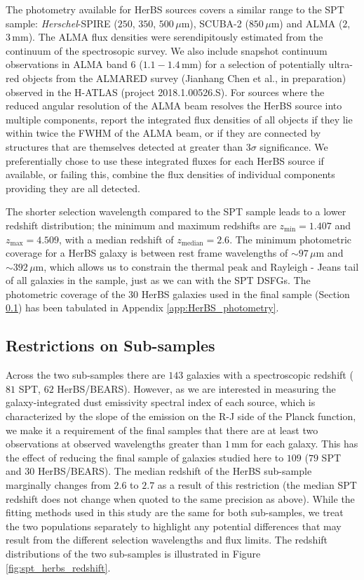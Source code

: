 The photometry available for HerBS sources covers a similar range to the SPT sample: \textit{Herschel}-SPIRE ($250$, $350$, $500\,\mu$m), SCUBA-2 ($850\,\mu$m) and ALMA ($2$, $3\,$mm). The ALMA flux densities were serendipitously estimated from the continuum of the spectrosopic survey. We also include snapshot continuum observations in ALMA band 6 ($1.1 - 1.4\,$mm) for a selection of potentially ultra-red objects from the ALMARED survey (Jianhang Chen et al., in preparation) observed in the H-ATLAS (project 2018.1.00526.S). For sources where the reduced angular resolution of the ALMA beam resolves the HerBS source into multiple components, \citealt{Bendo_2023} report the integrated flux densities of all objects if they lie within twice the FWHM of the ALMA beam, or if they are connected by structures that are themselves detected at greater than 3$\sigma$ significance. We preferentially chose to use these integrated fluxes for each HerBS source if available, or failing this, combine the flux densities of individual components providing they are all detected.

The shorter selection wavelength compared to the SPT sample leads to a lower redshift distribution; the minimum and maximum redshifts are $z_{\textrm{min}} = 1.407$ and $z_{\textrm{max}} = 4.509$, with a median redshift of $z_{\textrm{median}} = 2.6$. The minimum photometric coverage for a HerBS galaxy is between rest frame wavelengths of $\sim 97\,\mu$m and $\sim 392\,\mu$m, which allows us to constrain the thermal peak and Rayleigh - Jeans tail of all galaxies in the sample, just as we can with the SPT DSFGs. The photometric coverage of the 30 HerBS galaxies used in the final sample (Section \ref{sec:restrictions_on_sample}) has been tabulated in Appendix \ref{app:HerBS_photometry}.

\subsection{Restrictions on Sub-samples}
\label{sec:restrictions_on_sample}

Across the two sub-samples there are $143$ galaxies with a spectroscopic redshift ($81$ SPT, $62$ HerBS/BEARS). However, as we are interested in measuring the galaxy-integrated dust emissivity spectral index of each source, which is characterized by the slope of the emission on the R-J side of the Planck function, we make it a requirement of the final samples that there are at least two observations at observed wavelengths greater than $1\,$mm for each galaxy. This has the effect of reducing the final sample of galaxies studied here to $109$ ($79$ SPT and $30$ HerBS/BEARS). The median redshift of the HerBS sub-sample marginally changes from $2.6$ to $2.7$ as a result of this restriction (the median SPT redshift does not change when quoted to the same precision as above). While the fitting methods used in this study are the same for both sub-samples, we treat the two populations separately to highlight any potential differences that may result from the different selection wavelengths and flux limits. The redshift distributions of the two sub-samples is illustrated in Figure \ref{fig:spt_herbs_redshift}.


